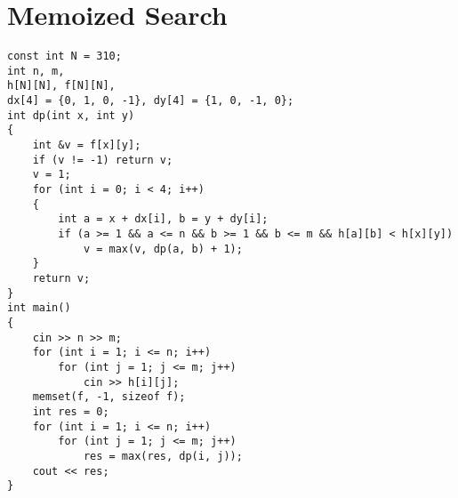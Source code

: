 \section{Memoized Search}
\begin{lstlisting}
const int N = 310;
int n, m, 
h[N][N], f[N][N], 
dx[4] = {0, 1, 0, -1}, dy[4] = {1, 0, -1, 0};
int dp(int x, int y)
{
    int &v = f[x][y];
    if (v != -1) return v;
    v = 1;
    for (int i = 0; i < 4; i++)
    {
        int a = x + dx[i], b = y + dy[i];
        if (a >= 1 && a <= n && b >= 1 && b <= m && h[a][b] < h[x][y])
            v = max(v, dp(a, b) + 1);
    }
    return v;
}
int main()
{
    cin >> n >> m;
    for (int i = 1; i <= n; i++)
        for (int j = 1; j <= m; j++)
            cin >> h[i][j];
    memset(f, -1, sizeof f);
    int res = 0;
    for (int i = 1; i <= n; i++)
        for (int j = 1; j <= m; j++)
            res = max(res, dp(i, j));
    cout << res;
}
\end{lstlisting}